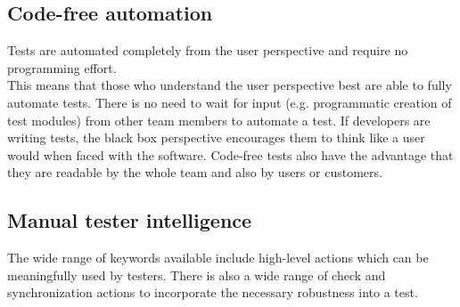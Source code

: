 \subsection{Code-free automation}

Tests are automated completely from the user perspective and require no programming effort. \\

This means that those who understand the user perspective best are able to fully automate tests. There is no need to wait for input (e.g. programmatic creation of test modules) from other team members to automate a test. If developers are writing tests, the black box perspective encourages them to think like a user would when faced with the software. Code-free tests also have the advantage that they are readable by the whole team and also by users or customers. 


\subsection{Manual tester intelligence}

The wide range of keywords available include high-level actions which can be meaningfully used by testers. There is also a wide range of check and synchronization actions to incorporate the necessary robustness into a test. 

